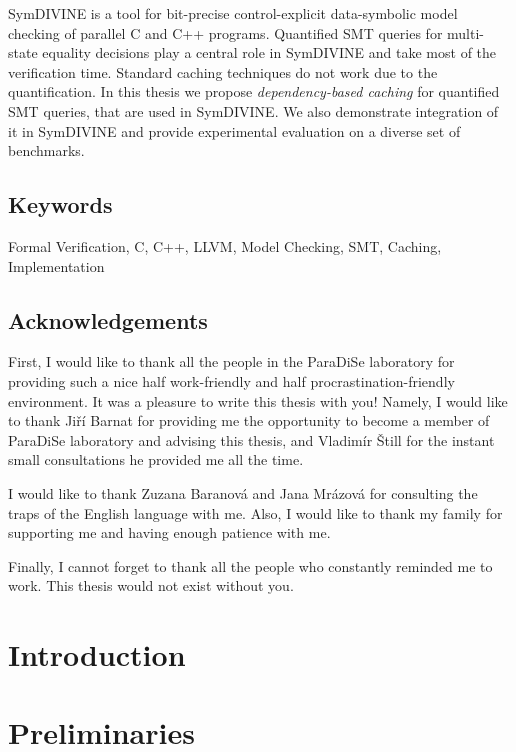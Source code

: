 \documentclass[11pt,twoside,a4paper]{book}
\newcommand{\symdivine}{\mbox{\textsf{SymDIVINE}}\xspace}
\newcommand{\smt}{\mbox{SMT}\xspace}
\newcommand{\llvm}{LLVM\xspace}
\begin{document}
\symdivine is a tool for bit-precise control-explicit data-symbolic model
checking of parallel C and C++ programs. Quantified \smt queries for multi-state
equality decisions play a central role in \symdivine and take most of the
verification time. Standard caching techniques do not work due to the
quantification. In this thesis we propose \textit{dependency-based caching} for
quantified \smt queries, that are used in \symdivine. We also demonstrate
integration of it in \symdivine and provide experimental evaluation on a diverse
set of benchmarks.

\section*{Keywords}
Formal Verification, C, C++, \llvm, Model Checking, \smt, Caching, Implementation

\cleardoublepage

\section*{Acknowledgements}
First, I would like to thank all the people in the ParaDiSe laboratory for
providing such a nice half work-friendly and half procrastination-friendly
environment. It was a pleasure to write this thesis with you! Namely, I would
like to thank Jiří Barnat for providing me the opportunity to become a member of
ParaDiSe laboratory and advising this thesis, and Vladimír Štill for the instant
small consultations he provided me all the time.

I would like to thank Zuzana Baranová and Jana Mrázová for consulting the traps
of the English language with me. Also, I would like to thank my family for
supporting me and having enough patience with me.

Finally, I cannot forget to thank all the people who constantly reminded me to
work. This thesis would not exist without you.


\cleardoublepage
\thispagestyle{empty}

\pagestyle{headings}
\tableofcontents %
\mainmatter

\chapter{Introduction}\label{chap:introduction}


\chapter{Preliminaries}\label{chap:preliminaries}

\end{document}
